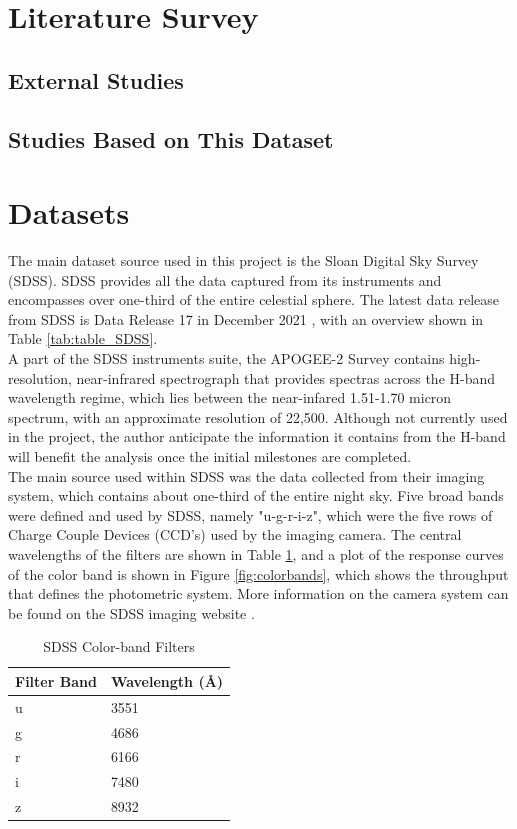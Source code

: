 \documentclass[11pt,sigconf]{acmart}
\begin{document}
\section{Literature Survey}

\subsection{External Studies}

\subsection{Studies Based on This Dataset}




\section{Datasets}

The main dataset source used in this project is the Sloan Digital Sky Survey (SDSS). 
SDSS provides all the data captured from its instruments and encompasses over one-third
of the entire celestial sphere. The latest data release from SDSS is Data Release 17 in
December 2021 \cite{abdurro}, with an overview shown in Table \ref{tab:table_SDSS}. 
\\
A part of the SDSS instruments suite, the APOGEE-2 Survey
contains high-resolution, near-infrared spectrograph that provides spectras across the 
H-band wavelength regime, which lies between the near-infared 1.51-1.70 micron spectrum, 
with an approximate resolution of 22,500. Although not currently used in the project,
the author anticipate the information it contains from the H-band will benefit the
analysis once the initial milestones are completed. 
\\
The main source used within SDSS was the data collected from their imaging system, which
contains about one-third of the entire night sky. Five broad bands were defined and 
used by SDSS, namely "u-g-r-i-z", which were the five rows of Charge Couple Devices (CCD's) 
used by the imaging camera. The central wavelengths of the filters are shown in 
Table \ref{tab:table_filters}, and a plot of the response curves of the color band 
is shown in Figure \ref{fig:colorbands}, which shows the throughput that defines the 
photometric system. More information on the camera system can be found on the SDSS 
imaging website \cite{sdss_imaging}. 

\begin{table}[]
  \begin{tabular}{ |p{2.2cm}|p{2.6cm}|  } \hline
   \textbf{Filter Band} & \textbf{Wavelength (\AA)} \\ \hline
   u & 3551 \\ \hline
   g & 4686 \\ \hline
   r & 6166 \\ \hline
   i & 7480 \\ \hline
   z & 8932 \\ \hline
  \end{tabular}
  \caption{\label{tab:table_filters}SDSS Color-band Filters \cite{sdss_imaging}}
\end{table}
\end{document}
